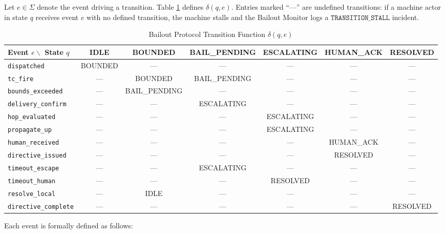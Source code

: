 Let $e \in \Sigma$ denote the event driving a transition. Table
\ref{tab:bailout-transition} defines $\delta(q, e)$. Entries marked ``—''
are undefined transitions: if a machine actor in state $q$ receives event $e$
with no defined transition, the machine stalls and the Bailout Monitor logs
a $\texttt{TRANSITION\_STALL}$ incident.

\begin{table}[H]
\centering
\caption{Bailout Protocol Transition Function $\delta(q, e)$}
\label{tab:bailout-transition}
\begin{tabular}{lcccccc}
\toprule
Event $e \backslash$ State $q$ & IDLE & BOUNDED & BAIL\_PENDING &
  ESCALATING & HUMAN\_ACK & RESOLVED \\
\midrule
\texttt{dispatched}           & BOUNDED & —    & —    & —    & —    & — \\
\texttt{tc\_fire}            & —       & BOUNDED & BAIL\_PENDING & — & — & — \\
\texttt{bounds\_exceeded}    & —       & BAIL\_PENDING & — & — & — & — \\
\texttt{delivery\_confirm}    & —       & —    & ESCALATING & — & — & — \\
\texttt{hop\_evaluated}       & —       & —    & —    & ESCALATING & — & — \\
\texttt{propagate\_up}       & —       & —    & —    & ESCALATING & — & — \\
\texttt{human\_received}     & —       & —    & —    & —    & HUMAN\_ACK & — \\
\texttt{directive\_issued}   & —       & —    & —    & —    & RESOLVED & — \\
\texttt{timeout\_escape}     & —       & —    & ESCALATING & — & — & — \\
\texttt{timeout\_human}      & —       & —    & —    & RESOLVED & — & — \\
\texttt{resolve\_local}       & —       & IDLE & —    & —    & — & — \\
\texttt{directive\_complete} & —       & —    & —    & —    & — & RESOLVED \\
\bottomrule
\end{tabular}
\end{table}

Each event is formally defined as follows:

